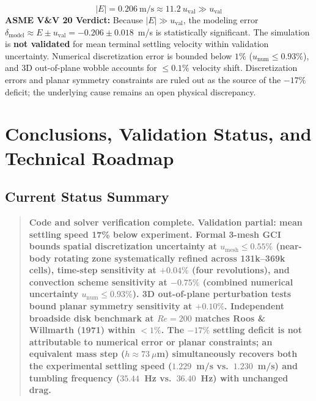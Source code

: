 \documentclass[11pt,a4paper]{article}
\begin{document}
\begin{equation}
|E| = 0.206\ \mathrm{m/s} \approx 11.2\ u_{\mathrm{val}} \gg u_{\mathrm{val}}
\end{equation}
\textbf{ASME V\&V 20 Verdict:} Because $|E| \gg u_{\mathrm{val}}$, the modeling error $\delta_{\mathrm{model}} \approx E \pm u_{\mathrm{val}} = -0.206 \pm 0.018$~m/s is statistically significant. The simulation is \textbf{not validated} for mean terminal settling velocity within validation uncertainty. Numerical discretization error is bounded below $1\%$ ($u_{\mathrm{num}} \le 0.93\%$), and 3D out-of-plane wobble accounts for $\le 0.1\%$ velocity shift. Discretization errors and planar symmetry constraints are ruled out as the source of the $-17\%$ deficit; the underlying cause remains an open physical discrepancy.

\section{Conclusions, Validation Status, and Technical Roadmap}

\subsection{Current Status Summary}
\begin{quote}
\textbf{Code and solver verification complete. Validation partial: mean settling speed 17\% below experiment. Formal 3-mesh GCI bounds spatial discretization uncertainty at $u_{\mathrm{mesh}} \le 0.55\%$ (near-body rotating zone systematically refined across 131k--369k cells), time-step sensitivity at $+0.04\%$ (four revolutions), and convection scheme sensitivity at $-0.75\%$ (combined numerical uncertainty $u_{\mathrm{num}} \le 0.93\%$). 3D out-of-plane perturbation tests bound planar symmetry sensitivity at $+0.10\%$. Independent broadside disk benchmark at $Re = 200$ matches Roos \& Willmarth (1971) within $< 1\%$. The $-17\%$ settling deficit is not attributable to numerical error or planar constraints; an equivalent mass step ($h \approx 73\ \mu$m) simultaneously recovers both the experimental settling speed ($1.229$~m/s vs.\ $1.230$~m/s) and tumbling frequency ($35.44$~Hz vs.\ $36.40$~Hz) with unchanged drag.}
\end{quote}
\end{document}
